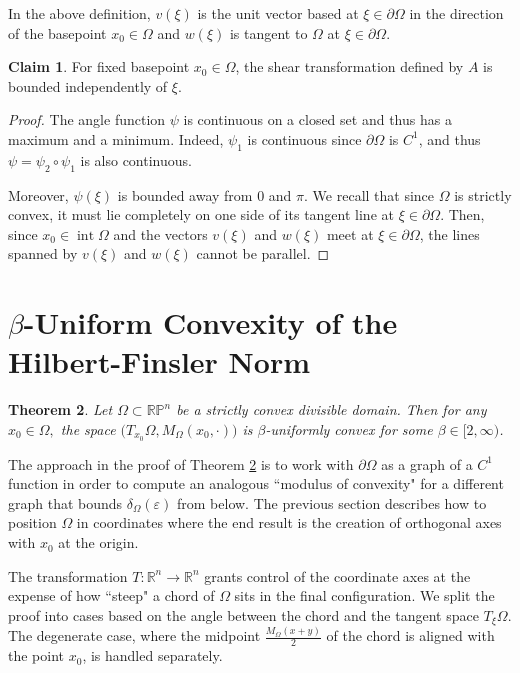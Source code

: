 \documentclass[letterpaper, 11pt, reqno]{amsart}
\newcommand\R{{\mathbb R}}
\newtheorem{thm}{Theorem}[section]
\theoremstyle{definition}
\newtheorem{claim}[thm]{Claim}
\DeclareMathOperator{\interior}{int}
\begin{document}
In the above definition, $v(\xi)$ is the unit vector based at $\xi \in \partial\Omega$ in the direction of the basepoint $x_0 \in \Omega$ and $w(\xi)$ is tangent to $\Omega$ at $\xi \in \partial\Omega$.

\begin{claim}
    For fixed basepoint $x_0 \in \Omega$, the shear transformation defined by $A$ is bounded independently of $\xi$.
\end{claim}

\begin{proof}
    The angle function $\psi$ is continuous on a closed set and thus has a maximum and a minimum. Indeed, $\psi_1$ is continuous since $\partial \Omega$ is $C^1$, and thus $\psi = \psi_2 \circ \psi_1$ is also continuous.
    
    Moreover, $\psi(\xi)$ is bounded away from 0 and $\pi$. We recall that since $\Omega$ is strictly convex, it must lie completely on one side of its tangent line at $\xi \in \partial \Omega$. Then, since $x_0 \in \interior \Omega$ and the vectors $v(\xi)$ and $w(\xi)$ meet at $\xi \in \partial \Omega$, the lines spanned by $v(\xi)$ and $w(\xi)$ cannot be parallel.
\end{proof}

\section{$\beta$-Uniform Convexity of the Hilbert-Finsler Norm}\label{sec:proof}

\begin{thm}
\label{thm:mainminkowski}
Let $\Omega \subset \mathbb{RP}^n$ be a strictly convex divisible domain. Then for any $x_0 \in \Omega,$ the space $\big(T_{x_0}\Omega, M_\Omega(x_0, \cdot)\big)$ is $\beta$-uniformly convex for some $\beta \in [2, \infty)$.
\end{thm}

The approach in the proof of Theorem \ref{thm:mainminkowski} is to work with $\partial \Omega$ as a graph of a $C^1$ function in order to compute an analogous ``modulus of convexity" for a different graph that bounds $\delta_\Omega(\varepsilon)$ from below. The previous section describes how to position $\Omega$ in coordinates where the end result is the creation of orthogonal axes with $x_0$ at the origin. 

The transformation $T: \R^n \longrightarrow \R^n$ grants control of the coordinate axes at the expense of how ``steep" a chord of $\Omega$ sits in the final configuration. We split the proof into cases based on the angle between the chord and the tangent space $T_\xi \Omega$. The degenerate case, where the midpoint $\frac{M_\Omega(x+y)}{2}$ of the chord is aligned with the point $x_0$, is handled separately.
\end{document}

